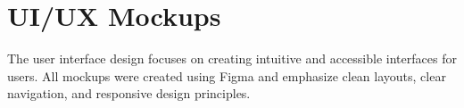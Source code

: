 \documentclass[11pt,a4paper]{article}
\begin{document}

\clearpage


\section{UI/UX Mockups}
The user interface design focuses on creating intuitive and accessible interfaces for users. All mockups were created using Figma and emphasize clean layouts, clear navigation, and responsive design principles.
\end{document}
